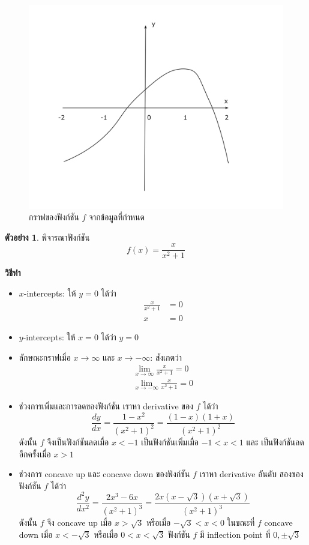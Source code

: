 \documentclass[
]{book}
\theoremstyle{definition}
\theoremstyle{definition}
\newtheorem{example}{ตัวอย่าง}[chapter]
\theoremstyle{definition}
\theoremstyle{definition}
\theoremstyle{remark}
\begin{document}
\begin{figure}

{\centering \includegraphics[width=0.5\linewidth]{images/graph2} 

}

\caption{กราฟของฟังก์ชัน $f$ จากข้อมูลที่กำหนด}\label{fig:graph2}
\end{figure}

\begin{example}
พิจารณาฟังก์ชัน \[f(x) = \frac{x}{x^2+1}\]
\end{example}

\textbf{วิธีทำ}

\begin{itemize}
\item
  \(x\)-intercepts: ให้ \(y=0\) ได้ว่า \begin{equation}   \begin{aligned}
      \frac{x}{x^2+1} &= 0 \\
      x &= 0
    \end{aligned} \end{equation}
\item
  \(y\)-intercepts: ให้ \(x=0\) ได้ว่า \(y=0\)
\item
  ลักษณะกราฟเมื่อ \(x \to \infty\) และ \(x \to -\infty\): สังเกตว่า
  \begin{equation}   \begin{aligned}
      \lim_{x\to \infty} \frac{x}{x^2+1} = 0 \\
      \lim_{x\to -\infty} \frac{x}{x^2+1} = 0
    \end{aligned} \end{equation}
\item
  ช่วงการเพิ่มและการลดของฟังก์ชัน เราหา derivative ของ \(f\) ได้ว่า
  \[\frac{dy}{dx} = \frac{1-x^2}{(x^2+1)^2}  =\frac{(1-x)(1+x)}{(x^2+1)^2}\]
  ดังนั้น \(f\) จึงเป็นฟังก์ชันลดเมื่อ \(x < -1\) เป็นฟังก์ชันเพิ่มเมื่อ \(-1 < x < 1\) และ
  เป็นฟังก์ชันลดอีกครั้งเมื่อ \(x>1\)
\item
  ช่วงการ concave up และ concave down ของฟังก์ชัน \(f\) เราหา derivative
  อันดับ สองของฟังก์ชัน \(f\) ได้ว่า
  \[\frac{d^2y}{dx^2} = \frac{2x^3-6x}{(x^2+1)^3} = \frac{2x(x-\sqrt{3})(x+\sqrt{3})}{(x^2+1)^3}\]
  ดังนั้น \(f\) จึง concave up เมื่อ \(x>\sqrt{3}\) หรือเมื่อ \(-\sqrt{3}<x<0\)
  ในขณะที่ \(f\) concave down เมื่อ \(x<-\sqrt{3}\) หรือเมื่อ \(0<x<\sqrt{3}\)
  ฟังก์ชัน \(f\) มี inflection point ที่ \(0,\pm\sqrt{3}\)
\end{itemize}
\end{document}
